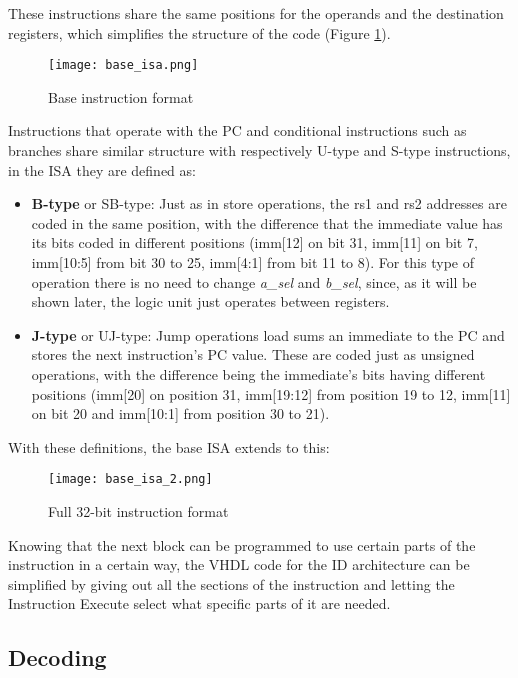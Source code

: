 These instructions share the same positions for the operands and the destination registers, which simplifies the structure of the code (Figure \ref{fig:base_form}).
\begin{figure}[h!]
  \centering
  \texttt{[image: base\_isa.png]}
  \caption{Base instruction format \cite{waterman2016riscv}}
  \label{fig:base_form}
\end{figure}
Instructions that operate with the PC and conditional instructions such as branches share similar structure with respectively U-type and S-type instructions, in the ISA they are defined as:
\begin{itemize}
  \item \textbf{B-type} or SB-type: Just as in store operations, the rs1 and rs2 addresses are coded in the same position, with the difference that the immediate value has its bits coded in different positions (imm[12] on bit 31, imm[11] on bit 7, imm[10:5] from bit 30 to 25, imm[4:1] from bit 11 to 8). For this type of operation there is no need to change \emph{a\_sel} and \emph{b\_sel}, since, as it will be shown later, the logic unit just operates between registers.
  \item \textbf{J-type} or UJ-type: Jump operations load sums an immediate to the PC and stores the next instruction's PC value. These are coded just as unsigned operations, with the difference being the immediate's bits having different positions (imm[20] on position 31, imm[19:12] from position 19 to 12, imm[11] on bit 20 and imm[10:1] from position 30 to 21).
\end{itemize}
With these definitions, the base ISA extends to this:

\begin{figure}[ht]
  \centering
  \texttt{[image: base\_isa\_2.png]}
  \caption{Full 32-bit instruction format \cite{waterman2016riscv}}
  \label{fig:full_form}
\end{figure}
Knowing that the next block can be programmed to use certain parts of the instruction in a certain way, the VHDL code for the ID architecture can be simplified by giving out all the sections of the instruction and letting the Instruction Execute select what specific parts of it are needed.

\subsection{Decoding}
